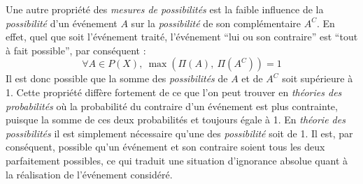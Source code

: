Une autre propriété des \emph{mesures de possibilités} est la faible
influence de la \emph{possibilité} d'un événement \(A\) sur la
\emph{possibilité} de son complémentaire \(A^C\). En effet, quel que
soit l’événement traité, l'événement \enquote{lui ou son contraire}
est \enquote{tout à fait possible}, par conséquent :
%
\begin{equation}
  \label{eq:poss_cont}
  ∀ A ∈ P(X),\ \max(Π(A),\ Π(A^C)) = 1  
\end{equation}
%
Il est donc possible que la somme des \emph{possibilités} de \(A\) et
de \(A^C\) soit supérieure à 1. Cette propriété diffère fortement de
ce que l'on peut trouver en \emph{théories des probabilités} où la
probabilité du contraire d'un événement est plus contrainte, puisque
la somme de ces deux probabilités et toujours égale à 1. En
\emph{théorie des possibilités} il est simplement nécessaire qu'une
des \emph{possibilité} soit de 1. Il est, par conséquent, possible
qu'un événement et son contraire soient tous les deux parfaitement
possibles, ce qui traduit une situation d'ignorance absolue quant à la
réalisation de l'événement considéré.

